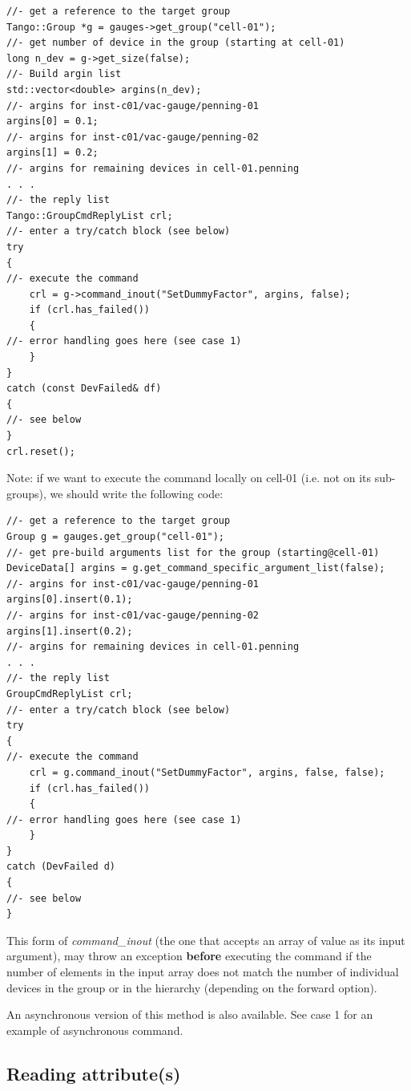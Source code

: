 \begin{verbatim}
//- get a reference to the target group
Tango::Group *g = gauges->get_group("cell-01");
//- get number of device in the group (starting at cell-01)
long n_dev = g->get_size(false);
//- Build argin list
std::vector<double> argins(n_dev);
//- argins for inst-c01/vac-gauge/penning-01
argins[0] = 0.1;
//- argins for inst-c01/vac-gauge/penning-02
argins[1] = 0.2;
//- argins for remaining devices in cell-01.penning
. . .
//- the reply list
Tango::GroupCmdReplyList crl;
//- enter a try/catch block (see below)
try
{
//- execute the command
    crl = g->command_inout("SetDummyFactor", argins, false);
    if (crl.has_failed())
    {
//- error handling goes here (see case 1)
    }
}
catch (const DevFailed& df)
{
//- see below
}
crl.reset();
\end{verbatim}


Note: if we want to execute the command locally on \textquotedbl{}cell-01\textquotedbl{}
(i.e. not on its sub-groups), we should write the following code:


\begin{verbatim}
//- get a reference to the target group
Group g = gauges.get_group("cell-01");
//- get pre-build arguments list for the group (starting@cell-01)
DeviceData[] argins = g.get_command_specific_argument_list(false);
//- argins for inst-c01/vac-gauge/penning-01
argins[0].insert(0.1);
//- argins for inst-c01/vac-gauge/penning-02
argins[1].insert(0.2);
//- argins for remaining devices in cell-01.penning
. . .
//- the reply list 
GroupCmdReplyList crl;
//- enter a try/catch block (see below)
try
{
//- execute the command
    crl = g.command_inout("SetDummyFactor", argins, false, false);
    if (crl.has_failed())
    {
//- error handling goes here (see case 1)
    }
}
catch (DevFailed d)
{
//- see below
}
\end{verbatim}


This form of \emph{command\_inout} (the one
that accepts an array of value as its input argument), may throw an
exception \textbf{before} executing the command
if the number of elements in the input array does not match the number
of individual devices in the group or in the hierarchy
(depending on the forward option). 

An asynchronous version of this method is also available. See case
1 for an example of asynchronous command.


\subsection{Reading attribute(s)\label{sub:Read-attr} }


